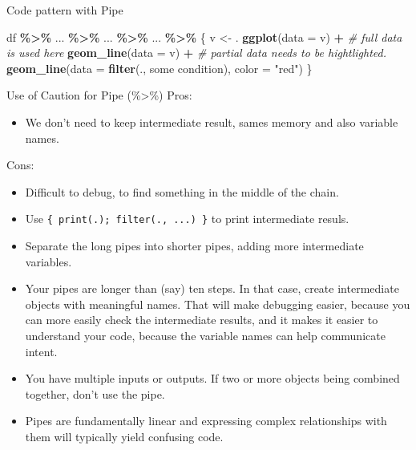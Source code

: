 \documentclass[
  10pt,
  ignorenonframetext,
  serif]{beamer}
\newenvironment{Shaded}{\begin{snugshade}}{\end{snugshade}}
\newcommand{\CommentTok}[1]{\textcolor[rgb]{0.56,0.35,0.01}{\textit{#1}}}
\newcommand{\DataTypeTok}[1]{\textcolor[rgb]{0.13,0.29,0.53}{#1}}
\newcommand{\KeywordTok}[1]{\textcolor[rgb]{0.13,0.29,0.53}{\textbf{#1}}}
\newcommand{\NormalTok}[1]{#1}
\newcommand{\OperatorTok}[1]{\textcolor[rgb]{0.81,0.36,0.00}{\textbf{#1}}}
\newcommand{\StringTok}[1]{\textcolor[rgb]{0.31,0.60,0.02}{#1}}
\providecommand{\tightlist}{%
  \setlength{\itemsep}{0pt}\setlength{\parskip}{0pt}}
\begin{document}
\begin{frame}[fragile]{Code pattern with Pipe}
\protect\hypertarget{code-pattern-with-pipe}{}
\begin{Shaded}
\begin{Highlighting}[]
\NormalTok{df }\OperatorTok{\%\textgreater{}\%}
\NormalTok{... }\OperatorTok{\%\textgreater{}\%}
\NormalTok{... }\OperatorTok{\%\textgreater{}\%}
\NormalTok{... }\OperatorTok{\%\textgreater{}\%}
\NormalTok{\{}
\NormalTok{  v \textless{}{-}}\StringTok{ }\NormalTok{.}
  \KeywordTok{ggplot}\NormalTok{(}\DataTypeTok{data =}\NormalTok{ v) }\OperatorTok{+}\StringTok{ }
\StringTok{    }\CommentTok{\# full data is used here}
\StringTok{    }\KeywordTok{geom\_line}\NormalTok{(}\DataTypeTok{data =}\NormalTok{ v) }\OperatorTok{+}
\StringTok{    }\CommentTok{\# partial data needs to be hightlighted.}
\StringTok{    }\KeywordTok{geom\_line}\NormalTok{(}\DataTypeTok{data =} \KeywordTok{filter}\NormalTok{(., some condition), }\DataTypeTok{color =} \StringTok{"red"}\NormalTok{)}
\NormalTok{\}}
\end{Highlighting}
\end{Shaded}
\end{frame}

\begin{frame}[fragile]{Use of Caution for Pipe (\%\textgreater\%)}
\protect\hypertarget{use-of-caution-for-pipe}{}
Pros:

\begin{itemize}
\tightlist
\item
  We don't need to keep intermediate result, sames memory and also
  variable names.
\end{itemize}

Cons:

\begin{itemize}
\item
  Difficult to debug, to find something in the middle of the chain.
\item
  Use \texttt{\{\ print(.);\ filter(.,\ ...)\ \}} to print intermediate
  resuls.
\item
  Separate the long pipes into shorter pipes, adding more intermediate
  variables.
\item
  Your pipes are longer than (say) ten steps. In that case, create
  intermediate objects with meaningful names. That will make debugging
  easier, because you can more easily check the intermediate results,
  and it makes it easier to understand your code, because the variable
  names can help communicate intent.
\item
  You have multiple inputs or outputs. If two or more objects being
  combined together, don't use the pipe.
\item
  Pipes are fundamentally linear and expressing complex relationships
  with them will typically yield confusing code.
\end{itemize}
\end{frame}
\end{document}
